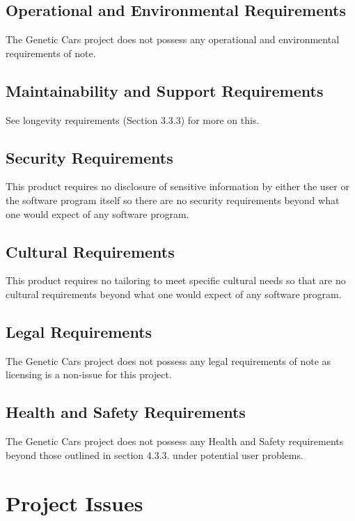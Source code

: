 \documentclass[12pt, titlepage]{article}
\begin{document}
\subsection{Operational and Environmental Requirements}

The Genetic Cars project does not possess any operational and environmental 
requirements of note.

\subsection{Maintainability and Support Requirements}

See longevity requirements (Section 3.3.3) for more on this.

\subsection{Security Requirements}

This product requires no disclosure of sensitive information by either the user 
or the software program itself so there are no security requirements beyond what 
one would expect of any software program.

\subsection{Cultural Requirements}

This product requires no tailoring to meet specific cultural needs so that are 
no cultural requirements beyond what one would expect of any software program.

\subsection{Legal Requirements}

The Genetic Cars project does not possess any legal requirements of note as 
licensing is a non-issue for this project.

\subsection{Health and Safety Requirements}

The Genetic Cars project does not possess any Health and Safety requirements beyond those outlined in section 4.3.3. under potential user problems.

\section{Project Issues}
\end{document}
